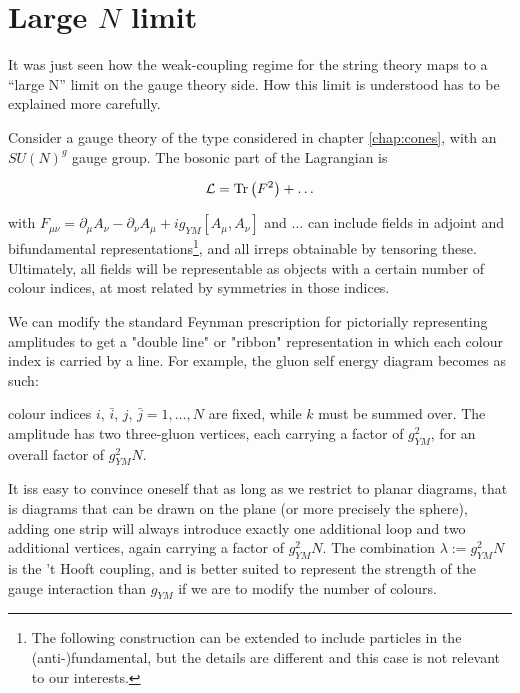 \section{Large $N$ limit}

It was just seen how the weak-coupling regime for the string theory maps to a ``large N'' limit on the gauge theory side. How this limit is understood has to be explained more carefully.

Consider a gauge theory of the type considered in chapter \ref{chap:cones}, with an $SU(N)^g$ gauge group. The bosonic part of the Lagrangian is

\begin{equation}
\mathcal{L} = \operatorname{Tr} \left(F^2\right) + \ldots 
\end{equation}

with $F_{\mu\nu} = \partial_\mu A_\nu - \partial_\nu A_\mu + i g_{YM} [A_\mu,A_\nu]$ and $\ldots$ can include fields in adjoint and bifundamental representations\footnote{The following construction can be extended to include particles in the (anti-)fundamental, but the details are different and this case is not relevant to our interests.}, and all irreps obtainable by tensoring these. Ultimately, all fields will be representable as objects with a certain number of colour indices, at most related by symmetries in those indices.

We can modify the standard Feynman prescription for pictorially representing amplitudes to get a "double line" or "ribbon" representation in which each colour index is carried by a line. For example, the gluon self energy diagram becomes as such:

\begin{center}
\def\svgwidth{200pt}

\end{center}

colour indices $i$, $\bar i$, $j$, $\bar j = 1 , \ldots , N$ are fixed, while $k$ must be summed over. The amplitude has two three-gluon vertices, each carrying a factor of $g_{YM}^2$, for an overall factor of $g_{YM}^2 N$.

It iss easy to convince oneself that as long as we restrict to planar diagrams, that is diagrams that can be drawn on the plane (or more precisely the sphere), adding one strip will always introduce exactly one additional loop and two additional vertices, again carrying a factor of $g_{YM}^2 N$. The combination $\lambda := g_{YM}^2 N$ is the 't Hooft coupling, and is better suited to represent the strength of the gauge interaction than $g_{YM}$ if we are to modify the number of colours.

